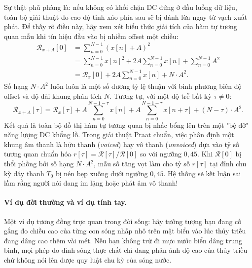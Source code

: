 Sự thật phũ phàng là: nếu không có khối chặn DC đứng ở đầu luồng dữ liệu, toàn bộ giải thuật đo cao độ tinh xảo phía sau sẽ bị đánh lừa ngay từ vạch xuất phát. Để thấy rõ điều này, hãy xem xét biểu thức giải tích của hàm tự tương quan mẫu khi tín hiệu đầu vào bị nhiễm offset một chiều:
\begin{align}
\mathcal{R}_{x+A}[0] &= \sum_{n=0}^{N-1} (x[n] + A)^2 \nonumber\\
&= \sum_{n=0}^{N-1} x[n]^2 + 2A\sum_{n=0}^{N-1} x[n] + \sum_{n=0}^{N-1} A^2 \nonumber\\
&= \mathcal{R}_x[0] + 2A\sum_{n=0}^{N-1} x[n] + N\cdot A^2.
\end{align}
Số hạng $N\cdot A^2$ luôn luôn là một số dương tỷ lệ thuận với bình phương biên độ offset và độ dài khung phân tích $N$. Tương tự, với một độ trễ bất kỳ $\tau \neq 0$:
\begin{equation}
\mathcal{R}_{x+A}[\tau] = \mathcal{R}_x[\tau] + A\sum_{n=0}^{N-1-\tau} x[n] + A\sum_{n=0}^{N-1-\tau} x[n+\tau] + (N-\tau)\cdot A^2.
\end{equation}
Kết quả là toàn bộ đồ thị hàm tự tương quan bị nhấc bổng lên trên một "bệ đỡ" năng lượng DC khổng lồ. Trong giải thuật Praat chuẩn, việc phân định một khung âm thanh là hữu thanh (\emph{voiced}) hay vô thanh (\emph{unvoiced}) dựa vào tỷ số tương quan chuẩn hóa $r[\tau] = \mathcal{R}[\tau] / \mathcal{R}[0]$ so với ngưỡng $0{,}45$. Khi $\mathcal{R}[0]$ bị thổi phồng bởi số hạng $N\cdot A^2$, mẫu số tăng vọt làm cho tỷ số $r[\tau]$ tại đỉnh chu kỳ dây thanh $T_0$ bị nén bẹp xuống dưới ngưỡng $0{,}45$. Hệ thống sẽ kết luận sai lầm rằng người nói đang im lặng hoặc phát âm vô thanh!

\paragraph{Ví dụ đời thường và ví dụ tính tay.}
Một ví dụ tương đồng trực quan trong đời sống: hãy tưởng tượng bạn đang cố gắng đo chiều cao của từng con sóng nhấp nhô trên mặt biển vào lúc thủy triều đang dâng cao thêm vài mét. Nếu bạn không trừ đi mực nước biển dâng trung bình, mọi phép đo đỉnh sóng thực chất chỉ đang phản ánh độ cao của thủy triều chứ không nói lên được quy luật chu kỳ của sóng nước.

